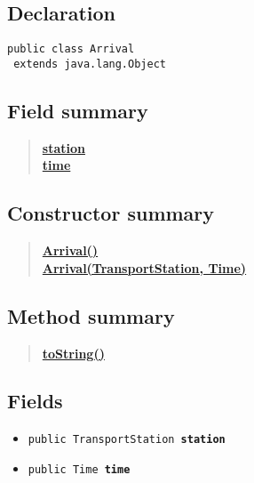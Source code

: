 \documentclass[11pt,a4paper]{report}
\begin{document}
{{{{{{{{{{{\subsection{Declaration}{
\begin{lstlisting}[frame=none]
public class Arrival
 extends java.lang.Object\end{lstlisting}
\subsection{Field summary}{
\begin{verse}
\hyperlink{models.Arrival.station}{{\bf station}} \\
\hyperlink{models.Arrival.time}{{\bf time}} \\
\end{verse}
}
\subsection{Constructor summary}{
\begin{verse}
\hyperlink{models.Arrival()}{{\bf Arrival()}} \\
\hyperlink{models.Arrival(models.TransportStation, models.Time)}{{\bf Arrival(TransportStation, Time)}} \\
\end{verse}
}
\subsection{Method summary}{
\begin{verse}
\hyperlink{models.Arrival.toString()}{{\bf toString()}} \\
\end{verse}
}
\subsection{Fields}{
\begin{itemize}
\item{
\label{models.Arrival.station}\hypertarget{models.Arrival.station}{\texttt{public TransportStation\ {\bf  station}}
}
}
\item{
\label{models.Arrival.time}\hypertarget{models.Arrival.time}{\texttt{public Time\ {\bf  time}}
}
}
\end{itemize}
}
}}}}}}}}}}}}
\end{document}
